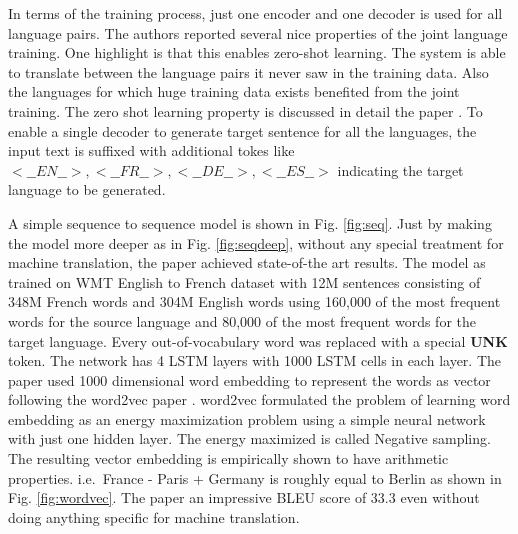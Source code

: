 \documentclass[a4paper]{article}
\begin{document}
In terms of the training process, just one encoder  and one decoder  is used for
all  language  pairs. The authors  reported several nice properties of the joint
language training. One highlight  is that  this enables zero-shot learning.  The
system is able  to translate between the  language  pairs it never  saw  in  the
training data. Also the languages for which huge  training data exists benefited
from the joint training. The zero shot learning property  is discussed in detail
the  paper  \cite{johnson2016google}.  To  enable  a single decoder to  generate
target  sentence for  all  the  languages,  the  input  text  is  suffixed  with
additional  tokes  like $<\_\_EN\_\_>, <\_\_FR\_\_>, <\_\_DE\_\_>, <\_\_ES\_\_>$
indicating the target language to be generated.

A simple sequence  to sequence  model is shown in  Fig. \ref{fig:seq}.  Just  by
making the model  more deeper as in Fig. \ref{fig:seqdeep}, without any  special
treatment for machine translation, the paper achieved state-of-the art  results.
The  model as trained  on  WMT  English  to  French dataset with  12M  sentences
consisting of 348M French words and 304M English words using 160,000 of the most
frequent words for the source language and 80,000 of the most frequent words for
the target language. Every  out-of-vocabulary word was replaced with  a  special
\textbf{UNK} token.  The network has 4  LSTM layers with 1000 LSTM cells in each
layer. The paper used 1000 dimensional  word embedding to represent the words as
vector  following  the word2vec  paper  \cite{mikolov2013distributed}.  word2vec
formulated  the  problem  of learning word embedding as an  energy  maximization
problem  using a  simple neural network with just  one  hidden layer. The energy
maximized  is  called  Negative  sampling.  The resulting  vector  embedding  is
empirically shown to  have  arithmetic properties.  i.e. $\,$France  -  Paris  +
Germany is roughly equal to Berlin as shown in Fig. \ref{fig:wordvec}. The paper
an impressive  BLEU  score  of  33.3 even without  doing  anything  specific for
machine translation.
\end{document}

